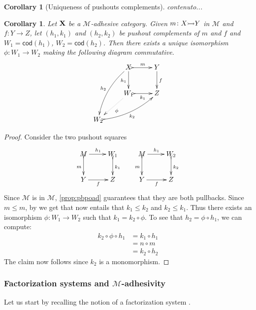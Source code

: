 \documentclass[a4paper]{article}
\newcommand{\cod}[1]{\mathsf{cod}({#1})}
\newcommand{\mto}[0]{\scalebox{1}{$\rightarrowtail$}}
\def\X{\textbf {\textup{X}}}
\def\Y{\textbf {\textup{Y}}}
\newtheorem{corollary}[theorem]{Corollary}
\theoremstyle{definition}
\begin{document}
\begin{corollary}[Uniqueness of pushouts complements]\label{lem:pocomp} 
	contenuto...
\end{corollary}


\begin{corollary}\label{cor:pbc}
Let $\X$ be a $\mathcal{M}$-adhesive category. Given $m\colon X\mto Y$ in $\mathcal{M}$ and $f\colon Y\to Z$, let $(h_1, k_1)$ and $(h_2, k_2)$ be pushout complements of $m$  and $f$ and $W_1=\cod{h_1}$, $W_2=\cod{h_2}$. Then there exists a unique isomorphism $\phi\colon W_1\to W_2$ making the following diagram commutative.
\[\xymatrix{&X \ar@{>->}[r]^{m} \ar[d]_{h_1} \ar@/_.3cm/[ddl]_{h_2}& Y \ar[d]^{f} \\ &W_1 \ar@{.>}[dl]^{\phi} \ar@{>->}[r]_{k_1} & Z \\ W_2 \ar@{>->}@/_.3cm/[urr]_{k_2}}\]
 
\end{corollary}
\begin{proof}
	Consider the two pushout squares
		\[\xymatrix{M \ar[r]^{h_1}\ar@{>->}[d]_{m}& W_1 \ar@{>->}[d]^{k_1} & M \ar@{>->}[d]_{m} \ar[r]^{h_1}& W_2 \ar@{>->}[d]^{k_2}\\Y\ar[r]_{f}&Z &Y \ar[r]_{f}&Z}\]
	Since $\mathcal{M}$ is in $\mathcal{M}$, \cref{prop:pbpoad} guarantees that they are both pullbacks.
	  Since $m\leq m$, by  we get that now entails that $k_1\leq k_2$ and $k_2\leq k_1$. Thus there exists an isomorphism $\phi\colon W_1\to W_2$ such that $k_1=k_2\circ \phi$. To see that $h_2=\phi\circ h_1$, we can compute:
	\begin{align*}
		k_2\circ \phi \circ h_1 & = k_1\circ h_1\\&= n\circ m\\&= k_2\circ h_2
	\end{align*}
	The claim now follows since $k_2$ is a monomorphism. \qedhere 
\end{proof}


\subsubsection{Factorization systems and $\mathcal{M}$-adhesivity} 
 Let us start by recalling the notion of a factorization system \cite{bousfield1977constructions,kelly1991note,rosicky2007factorization,tholen1983factorizations}.
\end{document}
